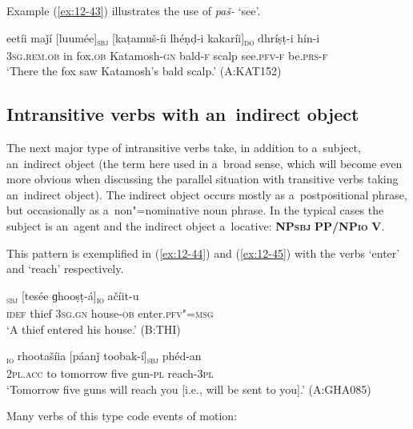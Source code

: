 Example (\ref{ex:12-43}) illustrates the use of \textit{paš-} `see'.

\begin{exe}
\ex
\label{ex:12-43}
\gll eetíi maǰí [luumée]\textsubscript{\textsc{sbj}} [kaṭamuš-íi lhéṇḍ-i kakaríi]\textsubscript{\textsc{do}} dhríṣṭ-i hín-i \\
\textsc{3sg.rem.ob} in fox.\textsc{ob} Katamosh-\textsc{gn} bald-\textsc{f} scalp see.\textsc{pfv-f} be.\textsc{prs-f} \\
\glt `There the fox saw Katamosh's bald scalp.' (A:KAT152)
\end{exe}

\subsection{Intransitive verbs with an~indirect object}
\label{subsec:12-2-4}

The next major type of intransitive verbs take, in addition to a~subject, an~indirect object (the term here used in a~broad sense, which will become even more obvious when discussing the parallel situation with transitive verbs taking an~indirect object). The indirect object occurs mostly as a~postpositional phrase, but occasionally as a~non"=nominative noun phrase. In the typical cases the subject is an~agent and the indirect object a~locative: \textbf{NP\textsc{sbj}} \textbf{PP/NP\textsc{io}} \textbf{V}.


This pattern is exemplified in (\ref{ex:12-44}) and (\ref{ex:12-45}) with the verbs `enter' and `reach' respectively.

\begin{exe}
\ex
\label{ex:12-44}
\gll [ak čoór]\textsubscript{\textsc{sbj}} [tesée ɡhooṣṭ-á]\textsubscript{\textsc{io}} ačíit-u \\
\textsc{idef} thief \textsc{3sg.gn} house-\textsc{ob} enter.\textsc{pfv"=msg} \\
\glt `A thief entered his house.' (B:THI)
\end{exe}
\begin{exe}
\ex
\label{ex:12-45}
\textsubscript{\textsc{io}} rhootašíia [páanǰ toobak-í]\textsubscript{\textsc{sbj}} phéd-an  \\
2\textsc{pl.acc} to tomorrow five gun-\textsc{pl} reach-\textsc{3pl} \\
\glt `Tomorrow five guns will reach you [i.e., will be sent to you].' (A:GHA085)
\end{exe}

Many verbs of this type code events of motion:


